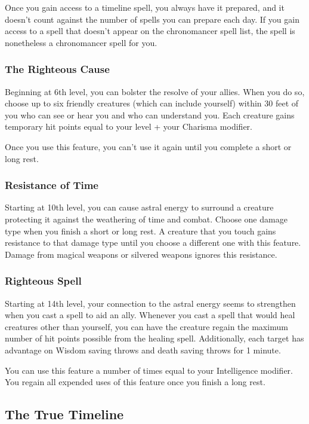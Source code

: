 Once you gain access to a timeline spell, you always have it prepared, and it doesn't count against the number of spells you can prepare each day. If you gain access to a spell that doesn't appear on the chronomancer spell list, the spell is nonetheless a chronomancer spell for you.

\subsubsection{The Righteous Cause}

Beginning at 6th level, you can bolster the resolve of your allies. When you do so, choose up to six friendly creatures (which can include yourself) within 30 feet of you who can see or hear you and who can understand you. Each creature gains temporary hit points equal to your level + your Charisma modifier.

Once you use this feature, you can't use it again until you complete a short or long rest.

\subsubsection{Resistance of Time}

Starting at 10th level, you can cause astral energy to surround a creature protecting it against the weathering of time and combat. Choose one damage type when you finish a short or long rest. A creature that you touch gains resistance to that damage type until you choose a different one with this feature. Damage from magical weapons or silvered weapons ignores this resistance.

\subsubsection{Righteous Spell}

Starting at 14th level, your connection to the astral energy seems to strengthen when you cast a spell to aid an ally. Whenever you cast a spell that would heal creatures other than yourself, you can have the creature regain the maximum number of hit points possible from the healing spell. Additionally, each target has advantage on Wisdom saving throws and death saving throws for 1 minute.

You can use this feature a number of times equal to your Intelligence modifier. You regain all expended uses of this feature once you finish a long rest.

\subsection{The True Timeline}

